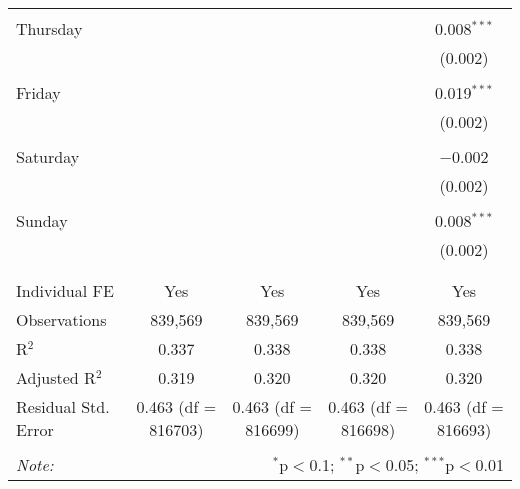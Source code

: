 \documentclass[
]{article}
\begin{document}
\begin{table}[!htbp]
{\begin{tabular}{@{\extracolsep{5pt}}lcccc}
  & & & & \\ 
 Thursday &  &  &  & 0.008$^{***}$ \\ 
  &  &  &  & (0.002) \\ 
  & & & & \\ 
 Friday &  &  &  & 0.019$^{***}$ \\ 
  &  &  &  & (0.002) \\ 
  & & & & \\ 
 Saturday &  &  &  & $-$0.002 \\ 
  &  &  &  & (0.002) \\ 
  & & & & \\ 
 Sunday &  &  &  & 0.008$^{***}$ \\ 
  &  &  &  & (0.002) \\ 
  & & & & \\ 
\hline \\[-1.8ex] 
Individual FE & Yes & Yes & Yes & Yes \\ 
Observations & 839,569 & 839,569 & 839,569 & 839,569 \\ 
R$^{2}$ & 0.337 & 0.338 & 0.338 & 0.338 \\ 
Adjusted R$^{2}$ & 0.319 & 0.320 & 0.320 & 0.320 \\ 
Residual Std. Error & 0.463 (df = 816703) & 0.463 (df = 816699) & 0.463 (df = 816698) & 0.463 (df = 816693) \\ 
\hline 
\hline \\[-1.8ex] 
\textit{Note:}  & \multicolumn{4}{r}{$^{*}$p$<$0.1; $^{**}$p$<$0.05; $^{***}$p$<$0.01} \\ 
\end{tabular}
} 
\end{table} 
\newpage
\end{document}
